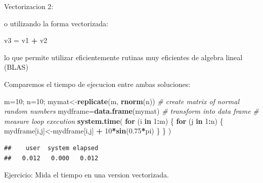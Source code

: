 \documentclass[ignorenonframetext,]{beamer}
\newenvironment{Shaded}{\begin{snugshade}}{\end{snugshade}}
\newcommand{\KeywordTok}[1]{\textcolor[rgb]{0.13,0.29,0.53}{\textbf{#1}}}
\newcommand{\DecValTok}[1]{\textcolor[rgb]{0.00,0.00,0.81}{#1}}
\newcommand{\FloatTok}[1]{\textcolor[rgb]{0.00,0.00,0.81}{#1}}
\newcommand{\StringTok}[1]{\textcolor[rgb]{0.31,0.60,0.02}{#1}}
\newcommand{\CommentTok}[1]{\textcolor[rgb]{0.56,0.35,0.01}{\textit{#1}}}
\newcommand{\ControlFlowTok}[1]{\textcolor[rgb]{0.13,0.29,0.53}{\textbf{#1}}}
\newcommand{\OperatorTok}[1]{\textcolor[rgb]{0.81,0.36,0.00}{\textbf{#1}}}
\newcommand{\NormalTok}[1]{#1}
\begin{document}
\begin{frame}[fragile]

\begin{block}{Vectorizacion 2:}

o utilizando la forma vectorizada:

\begin{Shaded}
\begin{Highlighting}[]
\NormalTok{v3 =}\StringTok{ }\NormalTok{v1 }\OperatorTok{+}\StringTok{ }\NormalTok{v2}
\end{Highlighting}
\end{Shaded}

lo que permite utilizar eficientemente rutinas muy eficientes de algebra
lineal (BLAS)

Comparemos el tiempo de ejecucion entre ambas soluciones:

\begin{Shaded}
\begin{Highlighting}[]
\NormalTok{m=}\DecValTok{10}\NormalTok{; n=}\DecValTok{10}\NormalTok{;}
\NormalTok{mymat<-}\KeywordTok{replicate}\NormalTok{(m, }\KeywordTok{rnorm}\NormalTok{(n)) }\CommentTok{# create matrix of normal random numbers}
\NormalTok{mydframe=}\KeywordTok{data.frame}\NormalTok{(mymat) }\CommentTok{# transform into data frame}
\CommentTok{# measure loop execution}
\KeywordTok{system.time}\NormalTok{(}
\ControlFlowTok{for}\NormalTok{ (i }\ControlFlowTok{in} \DecValTok{1}\OperatorTok{:}\NormalTok{m) \{}
\ControlFlowTok{for}\NormalTok{ (j }\ControlFlowTok{in} \DecValTok{1}\OperatorTok{:}\NormalTok{n) \{}
\NormalTok{mydframe[i,j]<-mydframe[i,j] }\OperatorTok{+}\StringTok{ }\DecValTok{10}\OperatorTok{*}\KeywordTok{sin}\NormalTok{(}\FloatTok{0.75}\OperatorTok{*}\NormalTok{pi)}
\NormalTok{\}}
\NormalTok{\}}
\NormalTok{)}
\end{Highlighting}
\end{Shaded}

\begin{verbatim}
##    user  system elapsed 
##   0.012   0.000   0.012
\end{verbatim}

Ejercicio: Mida el tiempo en una version vectorizada.

\end{block}

\end{frame}
\end{document}
